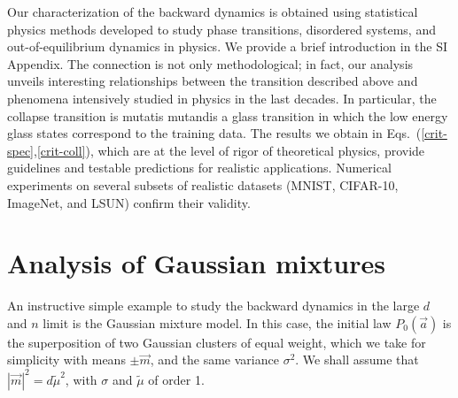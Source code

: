 \documentclass[10pt,twocolumn]{article}
\begin{document}
Our characterization of the backward dynamics is obtained using statistical physics methods developed to study phase transitions, disordered systems, and out-of-equilibrium dynamics in physics. We provide a brief introduction in the SI Appendix. The connection is not only methodological; in fact, our analysis unveils interesting relationships between the transition described above and phenomena intensively studied in physics in the last decades. In particular, the collapse transition is mutatis mutandis a glass transition in which the low energy glass states correspond to the training data.  The results we obtain in Eqs.~(\ref{crit-spec},\ref{crit-coll}), which are at the level of rigor of theoretical physics, provide guidelines and testable predictions for realistic applications. Numerical experiments on several subsets of realistic datasets (MNIST, CIFAR-10, ImageNet, and LSUN) confirm their validity.

\section*{Analysis of Gaussian mixtures}
An instructive simple example to study the backward dynamics in the large $d$ and $n$ limit is the Gaussian mixture model. In this case, the initial law $P_0(\vec a)$ is the superposition of two Gaussian clusters of equal weight, which we take for simplicity with means $\pm \vec m$, and the same variance $\sigma^2$.
We shall assume that  $|\vec m|^2 =d\tilde \mu^2$, with  $\sigma$ and $\tilde \mu$  of order 1. 
\end{document}
